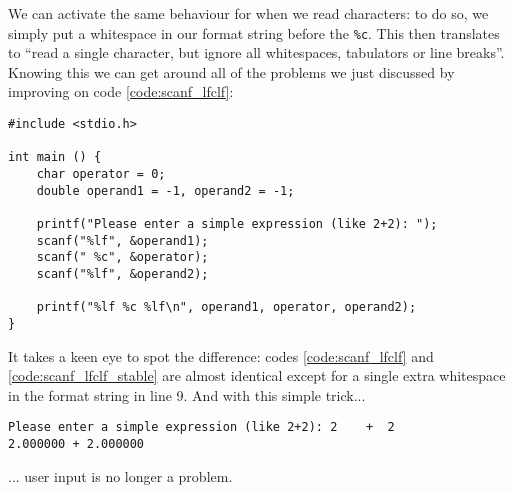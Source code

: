We can activate the same behaviour for when we read characters: to do so, we simply put a whitespace in our format string before the \texttt{\%c}. This then translates to \enquote{read a single character, but ignore all whitespaces, tabulators or line breaks}. Knowing this we can get around all of the problems we just discussed by improving on code \ref{code:scanf_lfclf}:
\begin{codebox}[enterExpressionImproved.c]
\begin{verbatim}
#include <stdio.h>

int main () {
    char operator = 0;
    double operand1 = -1, operand2 = -1;

    printf("Please enter a simple expression (like 2+2): ");
    scanf("%lf", &operand1);
    scanf(" %c", &operator);
    scanf("%lf", &operand2);

    printf("%lf %c %lf\n", operand1, operator, operand2);
}
\end{verbatim}
 \label{code:scanf_lfclf_stable}
\end{codebox}

It takes a keen eye to spot the difference: codes \ref{code:scanf_lfclf} and \ref{code:scanf_lfclf_stable} are almost identical except for a single extra whitespace in the format string in line 9. And with this simple trick...
\begin{cmdbox}
\begin{verbatim}
Please enter a simple expression (like 2+2): 2    +  2
2.000000 + 2.000000
\end{verbatim}
\end{cmdbox}
... user input is no longer a problem.

